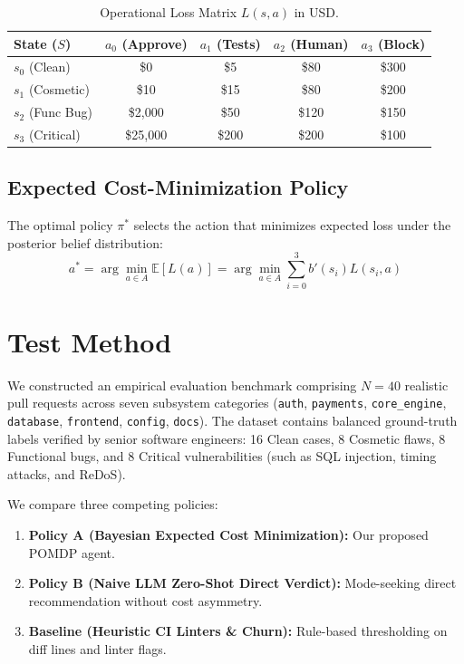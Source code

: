 \documentclass[10pt,twocolumn,letterpaper]{article}
\begin{document}
\begin{table}[h]
\centering
\small
\begin{tabular}{lcccc}
\toprule
\textbf{State ($S$)} & \textbf{$a_0$ (Approve)} & \textbf{$a_1$ (Tests)} & \textbf{$a_2$ (Human)} & \textbf{$a_3$ (Block)} \\
\midrule
$s_0$ (Clean) & \$0 & \$5 & \$80 & \$300 \\
$s_1$ (Cosmetic) & \$10 & \$15 & \$80 & \$200 \\
$s_2$ (Func Bug) & \$2,000 & \$50 & \$120 & \$150 \\
$s_3$ (Critical) & \$25,000 & \$200 & \$200 & \$100 \\
\bottomrule
\end{tabular}
\caption{Operational Loss Matrix $L(s, a)$ in USD.}
\label{tab:loss_matrix}
\end{table}

\subsection{Expected Cost-Minimization Policy}
The optimal policy $\pi^*$ selects the action that minimizes expected loss under the posterior belief distribution:
\begin{equation}
a^* = \arg\min_{a \in A} \mathbb{E}[L(a)] = \arg\min_{a \in A} \sum_{i=0}^3 b'(s_i) L(s_i, a)
\end{equation}

\section{Test Method}
We constructed an empirical evaluation benchmark comprising $N=40$ realistic pull requests across seven subsystem categories (\texttt{auth}, \texttt{payments}, \texttt{core\_engine}, \texttt{database}, \texttt{frontend}, \texttt{config}, \texttt{docs}). The dataset contains balanced ground-truth labels verified by senior software engineers: 16 Clean cases, 8 Cosmetic flaws, 8 Functional bugs, and 8 Critical vulnerabilities (such as SQL injection, timing attacks, and ReDoS).

We compare three competing policies:
\begin{enumerate}
    \item \textbf{Policy A (Bayesian Expected Cost Minimization):} Our proposed POMDP agent.
    \item \textbf{Policy B (Naive LLM Zero-Shot Direct Verdict):} Mode-seeking direct recommendation without cost asymmetry.
    \item \textbf{Baseline (Heuristic CI Linters \& Churn):} Rule-based thresholding on diff lines and linter flags.
\end{enumerate}
\end{document}
